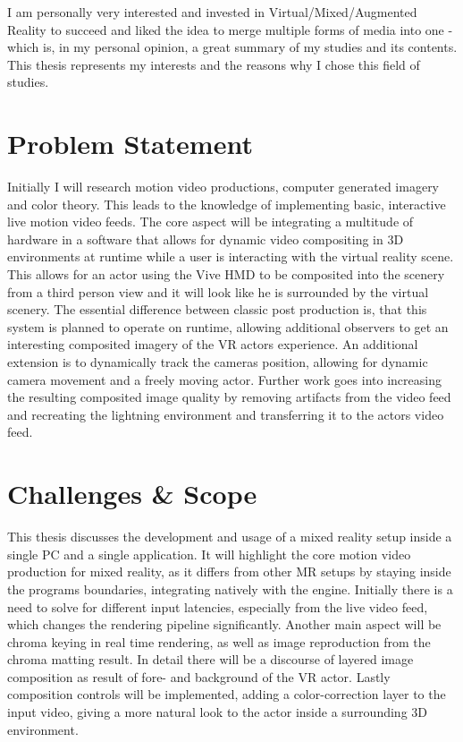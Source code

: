 I am personally very interested and invested in Virtual/Mixed/Augmented Reality 
to succeed and liked the idea to merge multiple forms of media into one - which 
is, in my personal opinion, a great summary of my studies and its contents. 
This thesis represents my interests and the reasons why I chose this field of 
studies.

\section{Problem Statement}
\label{sec:intro:problem}

Initially I will research motion video productions, computer generated imagery 
and color theory. This leads to the knowledge of implementing basic, 
interactive live motion video feeds.
\newline
The core aspect will be integrating a multitude of hardware in a software that 
allows for dynamic video compositing in 3D environments at runtime while a user 
is interacting with the virtual reality scene. This allows for an actor using 
the Vive HMD to be composited into the scenery from a third person view 
and it will look like he is surrounded by the virtual scenery. The essential 
difference between classic post production is, that this system is planned to 
operate on runtime, allowing additional observers to get an interesting 
composited imagery of the VR actors experience.
\newline
An additional extension is to dynamically track the cameras position, allowing 
for dynamic camera movement and a freely moving actor. Further work goes into 
increasing the resulting composited image quality by removing artifacts from 
the video feed and recreating the lightning environment and transferring it to 
the actors video feed. 

\section{Challenges \& Scope}
\label{sec:intro:challenges}

This thesis discusses the development and usage of a mixed reality setup inside 
a single PC and a single application.
\newline
It will highlight the core motion video production for mixed reality, as it 
differs from other MR setups by staying inside the programs boundaries, 
integrating natively with the engine. Initially there is a need to solve for 
different input latencies, especially from the live video feed, which changes 
the rendering pipeline significantly.
\newline
Another main aspect will be chroma keying in real time rendering, as well as 
image reproduction from the chroma matting result. In detail there will be a 
discourse of layered image composition as result of fore- and background of the 
VR actor.
\newline
Lastly composition controls will be implemented, adding a color-correction 
layer to the input video, giving a more natural look to the actor inside a 
surrounding 3D environment.

